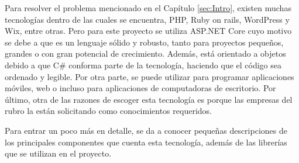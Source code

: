Para resolver el problema mencionado en el Capítulo \ref{sec:Intro}, existen muchas tecnologías dentro de las cuales se encuentra, PHP, Ruby on rails, WordPress y Wix, entre otras. Pero para este proyecto se utiliza ASP.NET Core cuyo motivo se debe a que es un lenguaje sólido y robusto, tanto para proyectos pequeños, grandes o con gran potencial de crecimiento. Además, está orientado a objetos debido a que C\# conforma parte de la tecnología, haciendo que el código sea ordenado y legible. Por otra parte, se puede utilizar para programar aplicaciones móviles, web o incluso para aplicaciones de computadoras de escritorio. Por último, otra de las razones de escoger esta tecnología es porque las empresas del rubro la están solicitando como conocimientos requeridos. 

Para entrar un poco más en detalle, se da a conocer pequeñas descripciones de los principales componentes que cuenta esta tecnología, además de las librerías que se utilizan en el proyecto.

